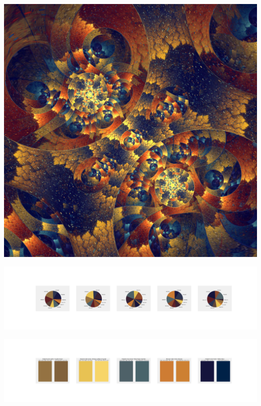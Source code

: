 \documentclass[11pt]{article}
\begin{document}
\begin{landscape}
    \begin{center}
    \includegraphics[width=\textwidth]{./nbimg/file (362).jpg}
    \end{center}

    \begin{center}
    \includegraphics[width=250mm]{./nbimg/pie-292.jpg}
    \end{center}

    \begin{center}
    \includegraphics[width=250mm]{./nbimg/peak-292.jpg}
    \end{center}
    


\end{landscape}
\end{document}

